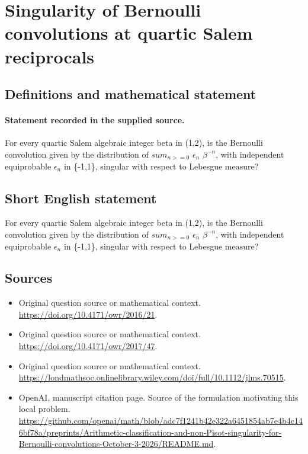 \documentclass[11pt]{article}
\begin{document}
\section*{Singularity of Bernoulli convolutions at quartic Salem reciprocals}\label{30007170}
\subsection{Definitions and mathematical statement}
\paragraph{Statement recorded in the supplied source.}
For every quartic Salem algebraic integer beta in (1,2), is the Bernoulli convolution given by the distribution of $sum_{n>=0}$ $\epsilon _n$ $\beta ^{-n}$, with independent equiprobable $\epsilon _n$ in \{-1,1\}, singular with respect to Lebesgue measure?
\subsection{Short English statement}
For every quartic Salem algebraic integer beta in (1,2), is the Bernoulli convolution given by the distribution of $sum_{n>=0}$ $\epsilon _n$ $\beta ^{-n}$, with independent equiprobable $\epsilon _n$ in \{-1,1\}, singular with respect to Lebesgue measure?
\subsection{Sources}
\begin{itemize}
\item[S1] Original question source or mathematical context.
\url{https://doi.org/10.4171/owr/2016/21}.
\item[S2] Original question source or mathematical context.
\url{https://doi.org/10.4171/owr/2017/47}.
\item[S3] Original question source or mathematical context.
\url{https://londmathsoc.onlinelibrary.wiley.com/doi/full/10.1112/jlms.70515}.
\item[S4] OpenAI, manuscript citation page. Source of the formulation motivating this local problem.
\url{https://github.com/openai/math/blob/adc7f1241b42e322a6451854ab7e4b4c146bf78a/preprints/Arithmetic-classification-and-non-Pisot-singularity-for-Bernoulli-convolutions-October-3-2026/README.md}.
\end{itemize}
\end{document}
